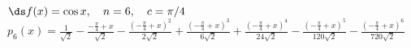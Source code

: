 {$\ds f(x) = \cos x, \quad n=6, \quad c=\pi/4$
}
{$p_6(x) = \frac{1}{\sqrt{2}}-\frac{-\frac{\pi
   }{4}+x}{\sqrt{2}}-\frac{\left(-\frac{\pi
   }{4}+x\right)^2}{2 \sqrt{2}}+\frac{\left(-\frac{\pi
   }{4}+x\right)^3}{6 \sqrt{2}}+\frac{\left(-\frac{\pi
   }{4}+x\right)^4}{24 \sqrt{2}}-\frac{\left(-\frac{\pi
   }{4}+x\right)^5}{120 \sqrt{2}}-\frac{\left(-\frac{\pi
   }{4}+x\right)^6}{720 \sqrt{2}}$
}